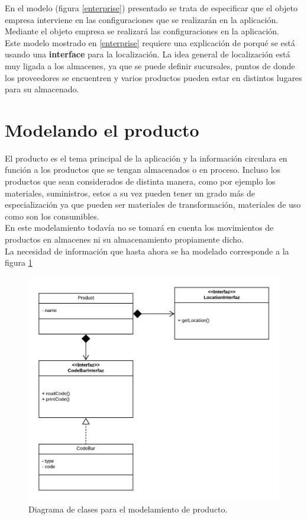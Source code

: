 En el modelo (figura \ref{enterprise}) presentado se trata de especificar que el objeto empresa interviene en las configuraciones que se realizarán en la aplicación. Mediante el objeto empresa se realizará las configuraciones en la aplicación.\\

Este modelo mostrado en \ref{enterprise} requiere una explicación de porqué se está usando una \textbf{interface} para la localización. La idea general de localización está muy ligada a los almacenes, ya que se puede definir sucursales, puntos de donde los proveedores se encuentren y varios productos pueden estar en distintos lugares para su almacenado.



\section{Modelando el producto}

El producto es el tema principal de la aplicación y la información circulara en función a los productos que se tengan almacenados o en proceso. Incluso los productos que sean considerados de distinta manera, como por ejemplo los materiales, suministros, estos a su vez pueden tener un grado más de especialización ya que pueden ser materiales de transformación, materiales de uso como son los consumibles.\\

En este modelamiento todavía no se tomará en cuenta los movimientos de productos en almacenes ni su almacenamiento propiamente dicho.\\

La necesidad de información que hasta ahora se ha modelado corresponde a la figura \ref{Product-classes}

\begin{figure}
  \centering
    \includegraphics[scale=0.9]{./Capitulo3/figs/ADDStock-Product.jpeg}
  \caption{Diagrama de clases para el modelamiento de producto.}
  \label{Product-classes}
\end{figure}

